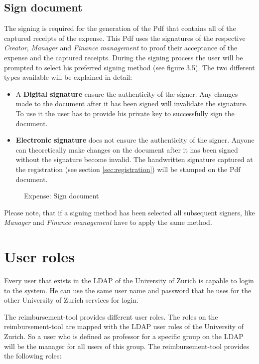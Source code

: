 \subsection*{Sign document}
\label{sec:signing}
The signing is required for the generation of the Pdf that contains all of the captured receipts of the expense. This Pdf uses the signatures of the respective \textit{Creator}, \textit{Manager} and \textit{Finance management} to proof their acceptance of the expense and the captured receipts. During the signing process the user will be prompted to select his preferred signing method (see figure 3.5). The two different types available will be explained in detail:
\begin{itemize}
    \item A \textbf{Digital signature} ensure the authenticity of the signer. Any changes made to the document after it has been signed will invalidate the signature. To use it the user has to provide his private key to successfully sign the document.
    \item \textbf{Electronic signature} does not ensure the authenticity of the signer. Anyone can theoretically make changes on the document after it has been signed without the signature become invalid. The handwritten signature captured at the registration (see section \ref{sec:registration}) will be stamped on the Pdf document.
\end{itemize}

\begin{figure}[H]
    \centering
    \caption{Expense: Sign document}
    \label{fig:expense-sign}
\end{figure}

Please note, that if a signing method has been selected all subsequent signers, like \textit{Manager} and \textit{Finance management} have to apply the same method.


\section*{User roles}
\label{user-roles}

Every user that exists in the LDAP of the University of Zurich is capable to login to the system. He can use the same user name and password that he uses for the other University of Zurich services for login.

The reimbursement-tool provides different user roles. The roles on the reimbursement-tool are mapped with the LDAP user roles of the University of Zurich. So a user who is defined as professor for a specific group on the LDAP will be the manager for all users of this group. The reimbursement-tool provides the following roles:

